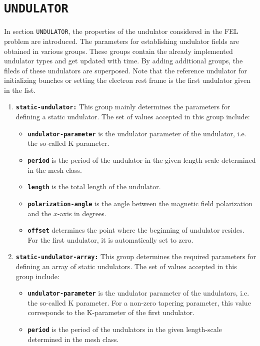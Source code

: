 \section{\texttt{UNDULATOR}}

In section \texttt{UNDULATOR}, the properties of the undulator considered in the FEL problem are introduced.
%
The parameters for establishing undulator fields are obtained in various groups.
%
These groups contain the already implemented undulator types and get updated with time.
%
By adding additional groups, the fileds of these undulators are superposed.
%
Note that the reference undulator for initializing bunches or setting the electron rest frame is the first undulator given in the list.

\begin{enumerate}
\item \textbf{\texttt{static-undulator:}} This group mainly determines the parameters for defining a static undulator. The set of values accepted in this group include:
\begin{itemize}
	\item \textbf{\texttt{undulator-parameter}} is the undulator parameter of the undulator, i.e. the so-called K parameter.
	\item \textbf{\texttt{period}} is the period of the undulator in the given length-scale determined in the mesh class.
	\item \textbf{\texttt{length}} is the total length of the undulator.
    \item \textbf{\texttt{polarization-angle}} is the angle between the magnetic field polarization and the $x$-axis in degrees.
    \item \textbf{\texttt{offset}} determines the point where the beginning of undulator resides. For the first undulator, it is automatically set to zero.
\end{itemize}
\item \textbf{\texttt{static-undulator-array:}} This group determines the required parameters for defining an array of static undulators. The set of values accepted in this group include:
\begin{itemize}
	\item \textbf{\texttt{undulator-parameter}} is the undulator parameter of the undulators, i.e. the so-called K parameter. For a non-zero tapering parameter, this value corresponds to the K-parameter of the first undulator.
	\item \textbf{\texttt{period}} is the period of the undulators in the given length-scale determined in the mesh class.

\end{itemize}
\end{enumerate}
